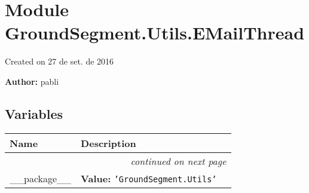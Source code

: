 %
%
%


\section{Module GroundSegment.Utils.EMailThread}

    \label{GroundSegment:Utils:EMailThread}
Created on 27 de set. de 2016

\textbf{Author:} pabli





  \subsection{Variables}

    \vspace{-1cm}
\hspace{\varindent}\begin{longtable}{|p{\varnamewidth}|p{\vardescrwidth}|l}
\cline{1-2}
\cline{1-2} \centering \textbf{Name} & \centering \textbf{Description}& \\
\cline{1-2}
\endhead\cline{1-2}\multicolumn{3}{r}{\small\textit{continued on next page}}\\\endfoot\cline{1-2}
\endlastfoot\raggedright \_\-\_\-p\-a\-c\-k\-a\-g\-e\-\_\-\_\- & \raggedright \textbf{Value:} 
{\tt \texttt{'}\texttt{GroundSegment.Utils}\texttt{'}}&\\
\cline{1-2}
\end{longtable}



